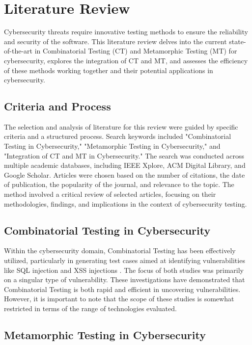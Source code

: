 \chapter{Literature Review}
\label{chap:lr}

Cybersecurity threats require innovative testing methods to ensure the reliability and security of the software. This literature review delves into the current state-of-the-art in Combinatorial Testing (CT) and Metamorphic Testing (MT) for cybersecurity, explores the integration of CT and MT, and assesses the efficiency of these methods working together and their potential applications in cybersecurity.

\section{Criteria and Process}

The selection and analysis of literature for this review were guided by specific criteria and a structured process. Search keywords included "Combinatorial Testing in Cybersecurity," "Metamorphic Testing in Cybersecurity," and "Integration of CT and MT in Cybersecurity." The search was conducted across multiple academic databases, including IEEE Xplore, ACM Digital Library, and Google Scholar. Articles were chosen based on the number of citations, the date of publication, the popularity of the journal, and relevance to the topic. The method involved a critical review of selected articles, focusing on their methodologies, findings, and implications in the context of cybersecurity testing.

\section{Combinatorial Testing in Cybersecurity}

Within the cybersecurity domain, Combinatorial Testing has been effectively utilized, particularly in generating test cases aimed at identifying vulnerabilities like SQL injection \cite{Simos2019SQL} and XSS injections \cite{Garn2014XSS}. The focus of both studies was primarily on a singular type of vulnerability. These investigations have demonstrated that Combinatorial Testing is both rapid and efficient in uncovering vulnerabilities. However, it is important to note that the scope of these studies is somewhat restricted in terms of the range of technologies evaluated.

\section{Metamorphic Testing in Cybersecurity}

